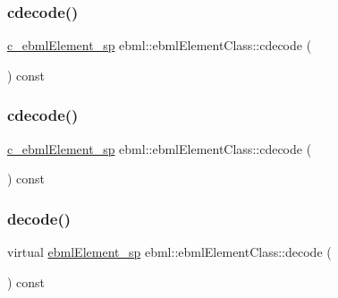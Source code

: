 \subsubsection{\texorpdfstring{cdecode()}{cdecode()}\hspace{0.1cm}{\footnotesize\ttfamily [5/6]}}
{\footnotesize\ttfamily \mbox{\hyperlink{namespaceebml_a2deef4e8071531b32e3533f1bf978917}{c\+\_\+ebml\+Element\+\_\+sp}} ebml\+::ebml\+Element\+Class\+::cdecode (\begin{DoxyParamCaption}\item[{\mbox{\hyperlink{namespaceebml_a7bb59128ac6af27e47367938a846b569}{io\+Base\+\_\+sp}} \&}]{ }\end{DoxyParamCaption}) const}

\mbox{\label{classebml_1_1ebmlElementClass_a583586c72ae328913f0a920843d46677}} 
\subsubsection{\texorpdfstring{cdecode()}{cdecode()}\hspace{0.1cm}{\footnotesize\ttfamily [6/6]}}
{\footnotesize\ttfamily \mbox{\hyperlink{namespaceebml_a2deef4e8071531b32e3533f1bf978917}{c\+\_\+ebml\+Element\+\_\+sp}} ebml\+::ebml\+Element\+Class\+::cdecode (\begin{DoxyParamCaption}\item[{\mbox{\hyperlink{classebml_1_1ioBase}{io\+Base}} $\ast$}]{ }\end{DoxyParamCaption}) const}

\mbox{\label{classebml_1_1ebmlElementClass_a9bda26f54e5d5a1e27aaaf0e124ec457}} 
\subsubsection{\texorpdfstring{decode()}{decode()}\hspace{0.1cm}{\footnotesize\ttfamily [1/6]}}
{\footnotesize\ttfamily virtual \mbox{\hyperlink{namespaceebml_adad533b7705a16bb360fe56380c5e7be}{ebml\+Element\+\_\+sp}} ebml\+::ebml\+Element\+Class\+::decode (\begin{DoxyParamCaption}\item[{const \mbox{\hyperlink{classebml_1_1parseString}{parse\+String}} \&}]{ }\end{DoxyParamCaption}) const\hspace{0.3cm}{\ttfamily [virtual]}}

